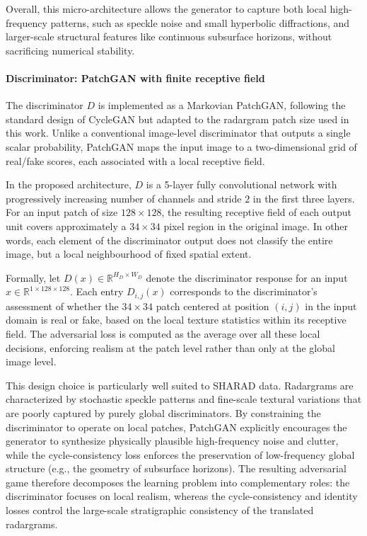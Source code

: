 Overall, this micro-architecture allows the generator to capture both local high-frequency patterns, such as speckle noise and small hyperbolic diffractions, and larger-scale structural features like continuous subsurface horizons, without sacrificing numerical stability.

\paragraph{Discriminator: PatchGAN with finite receptive field}
The discriminator $D$ is implemented as a Markovian PatchGAN, following the standard design of CycleGAN but adapted to the radargram patch size used in this work.
Unlike a conventional image-level discriminator that outputs a single scalar probability, PatchGAN maps the input image to a two-dimensional grid of real/fake scores, each associated with a local receptive field.

In the proposed architecture, $D$ is a 5-layer fully convolutional network with progressively increasing number of channels and stride $2$ in the first three layers.
For an input patch of size $128 \times 128$, the resulting receptive field of each output unit covers approximately a $34 \times 34$ pixel region in the original image.
In other words, each element of the discriminator output does not classify the entire image, but a local neighbourhood of fixed spatial extent.

Formally, let $D(x) \in \mathbb{R}^{H_D \times W_D}$ denote the discriminator response for an input $x \in \mathbb{R}^{1 \times 128 \times 128}$.
Each entry $D_{i,j}(x)$ corresponds to the discriminator's assessment of whether the $34 \times 34$ patch centered at position $(i,j)$ in the input domain is real or fake, based on the local texture statistics within its receptive field.
The adversarial loss is computed as the average over all these local decisions, enforcing realism at the patch level rather than only at the global image level.

This design choice is particularly well suited to SHARAD data.
Radargrams are characterized by stochastic speckle patterns and fine-scale textural variations that are poorly captured by purely global discriminators.
By constraining the discriminator to operate on local patches, PatchGAN explicitly encourages the generator to synthesize physically plausible high-frequency noise and clutter, while the cycle-consistency loss enforces the preservation of low-frequency global structure (e.g., the geometry of subsurface horizons).
The resulting adversarial game therefore decomposes the learning problem into complementary roles: the discriminator focuses on local realism, whereas the cycle-consistency and identity losses control the large-scale stratigraphic consistency of the translated radargrams.

